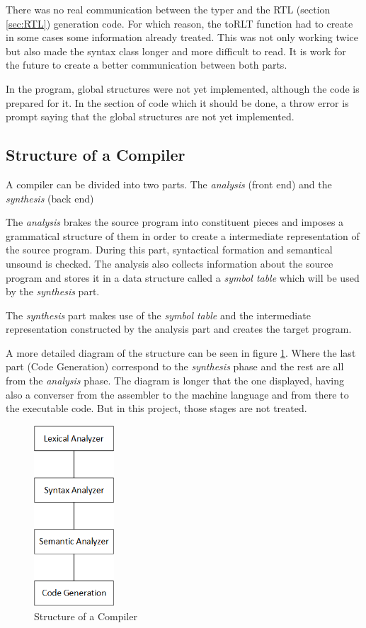 \documentclass[conference]{IEEEtran}
\begin{document}
There was no real communication between the typer and the RTL (section \ref{sec:RTL}) generation code. For which reason, the toRLT function had to create in some cases some information already treated. This was not only working twice but also made the syntax class longer and more difficult to read. It is work for the future to create a better communication between both parts.

In the program, global structures were not yet implemented, although the code is prepared for it. In the section of code which it should be done, a throw error is prompt saying that the global structures are not yet implemented.

\subsection{Structure of a Compiler}\label{sub_structure_of_a_compiler}

A compiler can be divided into two parts. The \textit{analysis} (front end) and the \textit{synthesis} (back end)

The \textit{analysis} brakes the source program into constituent pieces and imposes a grammatical structure of them in order to create a intermediate representation of the source program. During this part, syntactical formation and semantical unsound is checked. The analysis also collects information about the source program and stores it in a data structure called a \textit{symbol table} which will be used by the \textit{synthesis} part.

The \textit{synthesis} part makes use of the \textit{symbol table} and the intermediate representation constructed by the analysis part and creates the target program.

A more detailed diagram of the structure can be seen in figure \ref{fig_struct_of_compilator}. Where the last part (Code Generation) correspond to the \textit{synthesis} phase and the rest are all from the \textit{analysis} phase. The diagram is longer that the one displayed, having also a converser from the assembler to the machine language and from there to the executable code. But in this project, those stages are not treated.

\begin{figure}[H]
\centering
\includegraphics[width=3cm]{images/Diagram.png}
\caption{Structure of a Compiler}
\label{fig_struct_of_compilator}
\end{figure}
\end{document}
